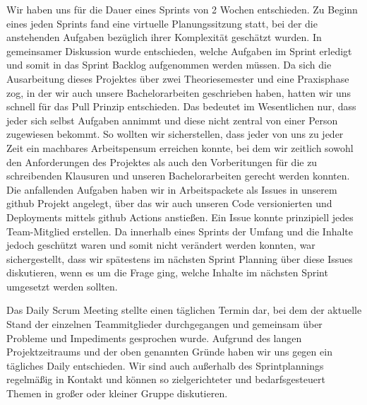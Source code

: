 Wir haben uns für die Dauer eines Sprints von 2 Wochen entschieden. Zu Beginn eines jeden Sprints fand eine virtuelle Planungssitzung statt, bei der die anstehenden Aufgaben bezüglich ihrer Komplexität geschätzt wurden. In gemeinsamer Diskussion wurde entschieden, welche Aufgaben im Sprint erledigt und somit in das Sprint Backlog aufgenommen werden müssen. Da sich die Ausarbeitung dieses Projektes über zwei Theoriesemester und eine Praxisphase zog, in der wir auch unsere Bachelorarbeiten geschrieben haben, hatten wir uns schnell für das Pull Prinzip entschieden. Das bedeutet im Wesentlichen nur, dass jeder sich selbst Aufgaben annimmt und diese nicht zentral von einer Person zugewiesen bekommt. So wollten wir sicherstellen, dass jeder von uns zu jeder Zeit ein machbares Arbeitspensum erreichen konnte, bei dem wir zeitlich sowohl den Anforderungen des Projektes als auch den Vorberitungen für die zu schreibenden Klausuren und unseren Bachelorarbeiten  gerecht werden konnten. Die anfallenden Aufgaben haben wir in Arbeitspackete als Issues in unserem github Projekt angelegt, über das wir auch unseren Code versionierten und Deployments mittels github Actions anstießen. Ein Issue konnte prinzipiell jedes Team-Mitglied erstellen. Da innerhalb eines Sprints der Umfang und die Inhalte jedoch geschützt waren  und somit nicht verändert werden konnten, war sichergestellt, dass wir spätestens im nächsten Sprint Planning über diese Issues diskutieren, wenn es um die Frage ging, welche Inhalte im nächsten Sprint umgesetzt werden sollten.

 Das Daily Scrum Meeting stellte einen täglichen Termin dar, bei dem der aktuelle Stand der einzelnen Teammitglieder durchgegangen und gemeinsam über Probleme und Impediments gesprochen wurde. Aufgrund des langen Projektzeitraums und der oben genannten Gründe haben wir uns gegen ein tägliches Daily entschieden. Wir sind auch außerhalb des Sprintplannings regelmäßig in Kontakt und können so zielgerichteter und bedarfsgesteuert Themen in großer oder kleiner Gruppe diskutieren. 
 
